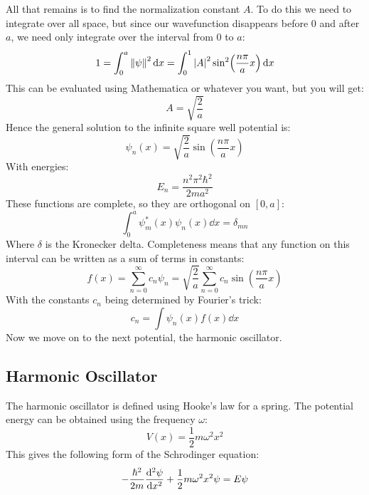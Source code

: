 All that remains is to find the normalization constant $A$. To do this we need to integrate over all space, but since our wavefunction disappears before $0$ and after $a$, we need only integrate over the interval from $0$ to $a$:
\begin{equation*}
  1=\int_0^a\norm{\psi}^2\dd{x}=\int_0^1\abs{A}^2\sin[2](\dfrac{n\pi}{a}x)\dd{x}
\end{equation*}
This can be evaluated using Mathematica or whatever you want, but you will get:
\begin{equation*}
  A=\sqrt{\dfrac{2}{a}}
\end{equation*}
Hence the general solution to the infinite square well potential is:
\begin{equation*}
  \psi_n(x)=\sqrt{\dfrac{2}{a}}\sin(\dfrac{n\pi}{a}x)
\end{equation*}
With energies:
\begin{equation*}
  E_n=\dfrac{n^2\pi^2\hbar^2}{2ma^2}
\end{equation*}
These functions are complete, so they are orthogonal on $[0,a]$:
\begin{equation*}
  \int_0^a\psi_m^*(x)\psi_n(x)\dd{x}=\delta_{mn}
\end{equation*}
Where $\delta$ is the Kronecker delta. Completeness means that any function on this interval can be written as a sum of terms in constants:
\begin{equation*}
  f(x)=\sum_{n=0}^{\infty}c_n\psi_n=
  \sqrt{\dfrac{2}{a}}\sum_{n=0}^{\infty}c_n\sin(\dfrac{n\pi}{a}x)
\end{equation*}
With the constants $c_n$ being determined by Fourier's trick:
\begin{equation*}
  c_n=\int\psi_n(x)f(x)\dd{x}
\end{equation*}
Now we move on to the next potential, the harmonic oscillator.
\subsection{Harmonic Oscillator}
The harmonic oscillator is defined using Hooke's law for a spring. The potential energy can be obtained using the frequency $\omega$:
\begin{equation*}
  V(x)=\dfrac{1}{2}m\omega^2x^2
\end{equation*}
This gives the following form of the Schrodinger equation:
\begin{equation*}
  -\dfrac{\hbar^2}{2m}\dv[2]{\psi}{x}+\dfrac{1}{2}m\omega^2x^2\psi=E\psi
\end{equation*}
